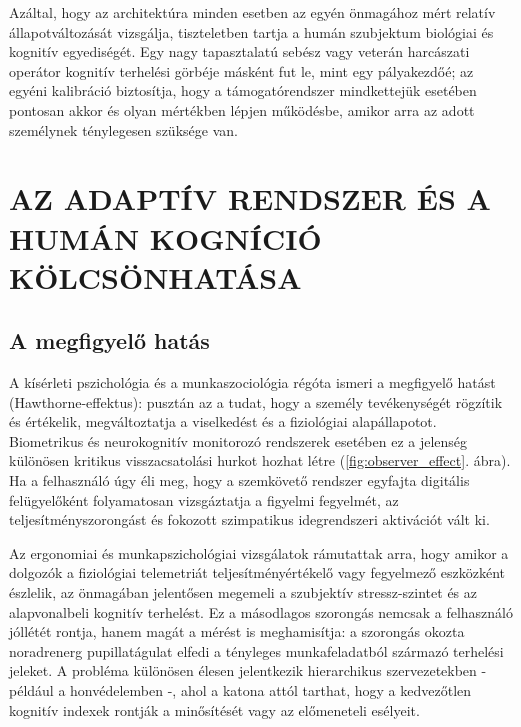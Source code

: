 \documentclass[12pt,a4paper,oneside]{book}
\begin{document}
Azáltal, hogy az architektúra minden esetben az egyén önmagához mért relatív állapotváltozását vizsgálja, tiszteletben tartja a humán szubjektum biológiai és kognitív egyediségét. Egy nagy tapasztalatú sebész vagy veterán harcászati operátor kognitív terhelési görbéje másként fut le, mint egy pályakezdőé; az egyéni kalibráció biztosítja, hogy a támogatórendszer mindkettejük esetében pontosan akkor és olyan mértékben lépjen működésbe, amikor arra az adott személynek ténylegesen szüksége van.

\section{AZ ADAPTÍV RENDSZER ÉS A HUMÁN KOGNÍCIÓ KÖLCSÖNHATÁSA}

\subsection{A megfigyelő hatás}

A kísérleti pszichológia és a munkaszociológia régóta ismeri a megfigyelő hatást (Hawthorne-effektus): pusztán az a tudat, hogy a személy tevékenységét rögzítik és értékelik, megváltoztatja a viselkedést és a fiziológiai alapállapotot. Biometrikus és neurokognitív monitorozó rendszerek esetében ez a jelenség különösen kritikus visszacsatolási hurkot hozhat létre (\ref{fig:observer_effect}. ábra). Ha a felhasználó úgy éli meg, hogy a szemkövető rendszer egyfajta digitális felügyelőként folyamatosan vizsgáztatja a figyelmi fegyelmét, az teljesítményszorongást és fokozott szimpatikus idegrendszeri aktivációt vált ki.

Az ergonomiai és munkapszichológiai vizsgálatok rámutattak arra, hogy amikor a dolgozók a fiziológiai telemetriát teljesítményértékelő vagy fegyelmező eszközként észlelik, az önmagában jelentősen megemeli a szubjektív stressz-szintet és az alapvonalbeli kognitív terhelést. Ez a másodlagos szorongás nemcsak a felhasználó jóllétét rontja, hanem magát a mérést is meghamisítja: a szorongás okozta noradrenerg pupillatágulat elfedi a tényleges munkafeladatból származó terhelési jeleket. A probléma különösen élesen jelentkezik hierarchikus szervezetekben - például a honvédelemben -, ahol a katona attól tarthat, hogy a kedvezőtlen kognitív indexek rontják a minősítését vagy az előmeneteli esélyeit.
\end{document}
